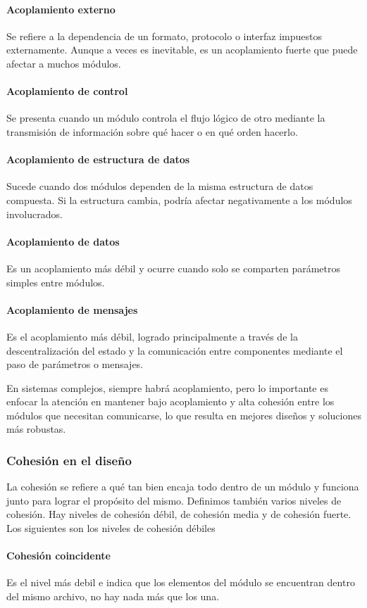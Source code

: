 \paragraph{Acoplamiento externo} Se refiere a la dependencia de un formato, protocolo o interfaz impuestos externamente. Aunque a veces es inevitable, es un acoplamiento fuerte que puede afectar a muchos módulos.
\paragraph{Acoplamiento de control} Se presenta cuando un módulo controla el flujo lógico de otro mediante la transmisión de información sobre qué hacer o en qué orden hacerlo.
\paragraph{Acoplamiento de estructura de datos} Sucede cuando dos módulos dependen de la misma estructura de datos compuesta. Si la estructura cambia, podría afectar negativamente a los módulos involucrados.
\paragraph{Acoplamiento de datos} Es un acoplamiento más débil y ocurre cuando solo se comparten parámetros simples entre módulos.
\paragraph{Acoplamiento de mensajes} Es el acoplamiento más débil, logrado principalmente a través de la descentralización del estado y la comunicación entre componentes mediante el paso de parámetros o mensajes.

En sistemas complejos, siempre habrá acoplamiento, pero lo importante es enfocar la atención en mantener bajo acoplamiento y alta cohesión entre los módulos que necesitan comunicarse, lo que resulta en mejores diseños y soluciones más robustas.

\subsubsection{Cohesión en el diseño} La cohesión se refiere a qué tan bien encaja todo dentro de un módulo y funciona junto para lograr el propósito del mismo. Definimos también varios niveles de cohesión. Hay niveles de cohesión débil, de cohesión media y de cohesión fuerte. 
Los siguientes son los niveles de cohesión débiles
\paragraph{Cohesión coincidente} Es el nivel más debil e indica que los elementos del módulo se encuentran dentro del mismo archivo, no hay nada más que los una.
